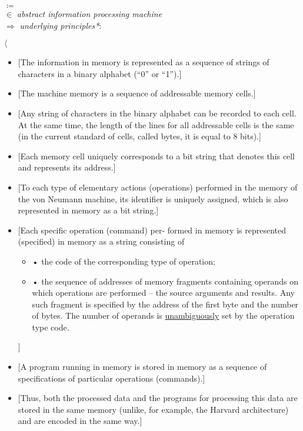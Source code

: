 \documentclass{article}
\begin{document}
\begin{multicols}{2}
\(\coloneqq\)  \\
\(\in\) \quad \textit{ abstract information processing machine} \\
\(\Rightarrow\) \quad \textit{underlying principles*}:
\par \quad \quad\(\langle\)
\begin{itemize}
    \item {[The information in memory is represented as a sequence of strings of characters in a binary alphabet (“0” or “1”).]}
    \item {[The machine memory is a sequence of addressable memory cells.]}
    \item {[Any string of characters in the binary alphabet can be recorded to each cell. At the same time, the length of the lines for all addressable cells is the same (in the current standard of cells, called bytes, it is equal to 8 bits).]}
    \item {[Each memory cell uniquely corresponds to a bit string that denotes this cell and represents its address.]}
    \item {[To each type of elementary actions (operations) performed in the memory of the von Neumann machine, its identifier is uniquely assigned, which is also represented in memory as a bit string.]}
    \item {[Each specific operation (command) per- formed in memory is represented (specified) in memory as a string consisting of \\ \begin{itemize}
        \item[] • the code of the corresponding type of operation;
        \item[] • the sequence of addresses of memory fragments containing operands on which operations are performed – the source arguments and results. Any such fragment is specified by the address of the first byte and the number of bytes. The number of operands is \underline{unambiguously} set by the operation type code.
    \end{itemize}
    ]}
    \item {[A program running in memory is stored in memory as a sequence of specifications of particular operations (commands).]}
    \item {[Thus, both the processed data and the programs for processing this data are stored in the same memory (unlike, for example, the Harvard architecture) and are encoded in the same way.]}
\end{itemize}

\end{multicols}
\end{document}
